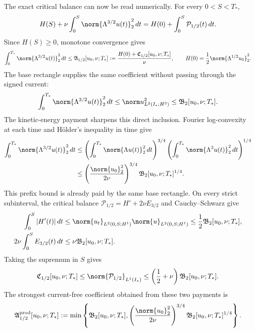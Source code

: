 The exact critical balance can now be read numerically.  For every
\(0<S<T_*\),
\begin{equation*}
 H(S)+\nu\int_0^S\norm{\Lambda^{3/2}u(t)}_2^2\,dt
 =H(0)+\int_0^S\mathcal P_{1/2}(t)\,dt.
\end{equation*}
Since \(H(S)\ge0\), monotone convergence gives
\begin{equation}
 \int_0^{T_*}\norm{\Lambda^{3/2}u(t)}_2^2\,dt
 \le \mathfrak A_{1/2}[u_0,\nu;T_*]
 :=\frac{H(0)+\mathfrak C_{1/2}[u_0,\nu;T_*]}{\nu},
 \qquad
 H(0)=\frac12\norm{\Lambda^{1/2}u_0}_2^2.
 \label{eq:critical-coefficient-value}
\end{equation}
The base rectangle supplies the same coefficient without passing through the
signed current:
\begin{equation}
 \int_0^{T_*}\norm{\Lambda^{3/2}u(t)}_2^2\,dt
 \le \norm u_{L^2(I_*;H^3)}^2
 \le \mathfrak B_2[u_0,\nu;T_*].
 \label{eq:base-rectangle-critical-coefficient}
\end{equation}
The kinetic-energy payment sharpens this direct inclusion.  Fourier
log-convexity at each time and H\"older's inequality in time give
\begin{align*}
 \int_0^{T_*}\norm{\Lambda^{3/2}u(t)}_2^2\,dt
 &\le
 \left(\int_0^{T_*}\norm{\Lambda u(t)}_2^2\,dt\right)^{3/4}
 \left(\int_0^{T_*}\norm{\Lambda^3u(t)}_2^2\,dt\right)^{1/4}\\
 &\le
 \left(\frac{\norm{u_0}_2^2}{2\nu}\right)^{3/4}
 \mathfrak B_2[u_0,\nu;T_*]^{1/4}.
\end{align*}
This prefix bound is already paid by the same base rectangle.  On every
strict subinterval, the critical balance
\(\mathcal P_{1/2}=H'+2\nu E_{3/2}\) and Cauchy--Schwarz give
\begin{align*}
 \int_0^S|H'(t)|\,dt
 &\le
 \norm{u_t}_{L^2(0,S;H^1)}
 \norm{u}_{L^2(0,S;H^1)}
 \le\frac12\mathfrak B_2[u_0,\nu;T_*],\\
 2\nu\int_0^S E_{3/2}(t)\,dt
 &\le\nu\mathfrak B_2[u_0,\nu;T_*].
\end{align*}
Taking the supremum in \(S\) gives
\begin{equation}
 \mathfrak C_{1/2}[u_0,\nu;T_*]
 \le\norm{\mathcal P_{1/2}}_{L^1(I_*)}
 \le\left(\frac12+\nu\right)
 \mathfrak B_2[u_0,\nu;T_*].
 \label{eq:base-rectangle-critical-prefix}
\end{equation}
The strongest current-free coefficient obtained from these two payments is
\begin{equation}
 \mathfrak A_{1/2}^{\rm prod}[u_0,\nu;T_*]
 :=\min\left\{
 \mathfrak B_2[u_0,\nu;T_*],
 \left(\frac{\norm{u_0}_2^2}{2\nu}\right)^{3/4}
 \mathfrak B_2[u_0,\nu;T_*]^{1/4}
 \right\}.
 \label{eq:producer-critical-coefficient}
\end{equation}
